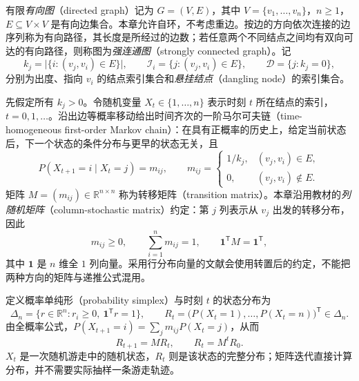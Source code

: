 \begin{definition}[有向图与连通性]
\label{def:lihang-pr-directed-graph}
有限\emph{有向图}（directed graph）记为 $G=(V,E)$，其中 $V=\{v_1,\ldots,v_n\}$，$n\geq1$，$E\subseteq V\times V$ 是有向边集合。本章允许自环，不考虑重边。按边的方向依次连接的边序列称为有向路径，其长度是所经过的边数；若任意两个不同结点之间均有双向可达的有向路径，则称图为\emph{强连通图}（strongly connected graph）。记
\[
    k_j=\bigl|\{i:(v_j,v_i)\in E\}\bigr|,\qquad
    \mathcal I_i=\{j:(v_j,v_i)\in E\},\qquad
    \mathcal D=\{j:k_j=0\},
\]
分别为出度、指向 $v_i$ 的结点索引集合和\emph{悬挂结点}（dangling node）的索引集合。
\end{definition}

先假定所有 $k_j>0$。令随机变量 $X_t\in\{1,\ldots,n\}$ 表示时刻 $t$ 所在结点的索引，$t=0,1,\ldots$。沿出边等概率移动给出时间齐次的一阶马尔可夫链（time-homogeneous first-order Markov chain）：在具有正概率的历史上，给定当前状态后，下一个状态的条件分布与更早的状态无关，且
\begin{equation}
\label{eq:lihang-pr-transition}
    P(X_{t+1}=i\mid X_t=j)=m_{ij},\qquad
    m_{ij}=\begin{cases}
        1/k_j,&(v_j,v_i)\in E,\\
        0,&(v_j,v_i)\notin E.
    \end{cases}
\end{equation}
矩阵 $M=(m_{ij})\in\mathbb R^{n\times n}$ 称为转移矩阵（transition matrix）。本章沿用教材的\emph{列随机矩阵}（column-stochastic matrix）约定：第 $j$ 列表示从 $v_j$ 出发的转移分布，因此
\begin{equation}
\label{eq:lihang-pr-stochastic}
    m_{ij}\geq0,\qquad \sum_{i=1}^{n}m_{ij}=1,\qquad
    \boldsymbol 1^{\mathsf T}M=\boldsymbol 1^{\mathsf T},
\end{equation}
其中 $\boldsymbol 1$ 是 $n$ 维全 $1$ 列向量。采用行分布向量的文献会使用转置后的约定，不能把两种方向的矩阵与递推公式混用。

定义概率单纯形（probability simplex）与时刻 $t$ 的状态分布为
\[
    \Delta_n=\{r\in\mathbb R^n:r_i\geq0,\ \boldsymbol 1^{\mathsf T}r=1\},\qquad
    R_t=\bigl(P(X_t=1),\ldots,P(X_t=n)\bigr)^{\mathsf T}\in\Delta_n.
\]
由全概率公式，$P(X_{t+1}=i)=\sum_jm_{ij}P(X_t=j)$，从而
\begin{equation}
\label{eq:lihang-pr-distribution-update}
    R_{t+1}=MR_t,\qquad R_t=M^tR_0.
\end{equation}
$X_t$ 是一次随机游走中的随机状态，$R_t$ 则是该状态的完整分布；矩阵迭代直接计算分布，并不需要实际抽样一条游走轨迹。

